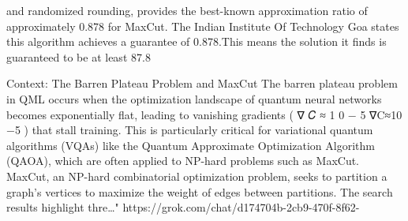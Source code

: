 and randomized rounding, provides the best-known approximation ratio of approximately 0.878 for MaxCut. The Indian Institute Of Technology Goa states this algorithm achieves a guarantee of 0.878.This means the solution it finds is guaranteed to be at least 87.8%

Context: The Barren Plateau Problem and MaxCut The barren plateau problem in QML occurs when the optimization landscape of quantum neural networks becomes exponentially flat, leading to vanishing gradients ( ∇ 𝐶 ≈ 1 0 − 5 ∇C≈10 −5 ) that stall training. This is particularly critical for variational quantum algorithms (VQAs) like the Quantum Approximate Optimization Algorithm (QAOA), which are often applied to NP-hard problems such as MaxCut. MaxCut, an NP-hard combinatorial optimization problem, seeks to partition a graph’s vertices to maximize the weight of edges between partitions. The search results highlight thre…" https://grok.com/chat/d174704b-2cb9-470f-8f62-